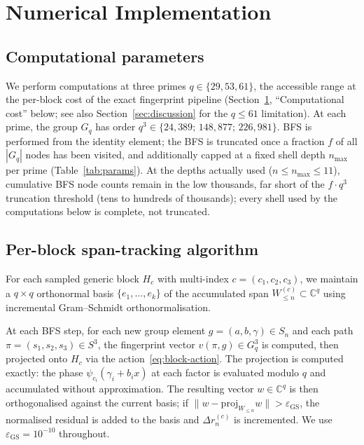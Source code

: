 \section{Numerical Implementation}
  \label{sec:numerics}

  \subsection{Computational parameters}

    We perform computations at three primes $q\in\{29,53,61\}$, the accessible range at the
    per-block cost of the exact fingerprint pipeline (Section~\ref{sec:numerics},
    ``Computational cost'' below; see also Section~\ref{sec:discussion} for the $q\leq 61$
    limitation).
    At each prime, the group $G_q$ has order $q^3\in\{24{,}389;\,148{,}877;\,226{,}981\}$.
    BFS is performed from the identity element; the BFS is truncated once a fraction $f$
    of all $|G_q|$ nodes has been visited, and additionally capped at a fixed shell depth
    $n_{\max}$ per prime (Table~\ref{tab:params}).
    At the depths actually used ($n\leq n_{\max}\leq 11$), cumulative BFS node counts remain
    in the low thousands, far short of the $f\cdot q^3$ truncation threshold (tens to hundreds
    of thousands); every shell used by the computations below is complete, not truncated.

  \subsection{Per-block span-tracking algorithm}

    For each sampled generic block $H_c$ with multi-index $c=(c_1,c_2,c_3)$, we maintain
    a $q\times q$ orthonormal basis $\{e_1,\ldots,e_k\}$ of the accumulated span
    $W_{\leq n}^{(c)}\subset\mathbb{C}^q$ using incremental Gram--Schmidt orthonormalisation.

    At each BFS step, for each new group element $g=(a,b,\gamma)\in S_n$ and each
    path $\pi=(s_1,s_2,s_3)\in S^3$, the fingerprint vector $v(\pi,g)\in G_q^3$ is
    computed, then projected onto $H_c$ via the action~\eqref{eq:block-action}.
    The projection is computed exactly: the phase $\psi_{c_i}(\gamma_i+b_i x)$ at
    each factor is evaluated modulo $q$ and accumulated without approximation.
    The resulting vector $w\in\mathbb{C}^q$ is then orthogonalised against the current
    basis; if $\|w - \mathrm{proj}_{W_{\leq n}}w\|> \varepsilon_{\mathrm{GS}}$, the
    normalised residual is added to the basis and $\Delta r_n^{(c)}$ is incremented.
    We use $\varepsilon_{\mathrm{GS}}=10^{-10}$ throughout.

